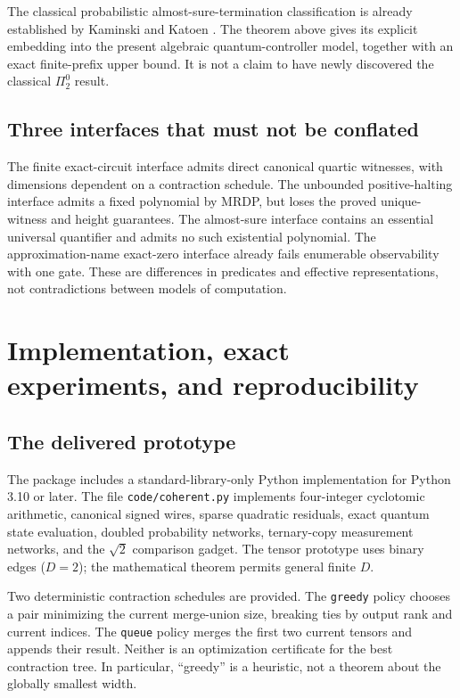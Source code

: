 \documentclass[11pt,letterpaper]{article}
\numberwithin{equation}{section}
\theoremstyle{definition}
\theoremstyle{remark}
\newcommand{\srcmark}[1]{\par\noindent{\small\itshape [source~#1]}\par}
\begin{document}
The classical probabilistic almost-sure-termination classification is already
established by Kaminski and Katoen \cite{kaminski-katoen}. The theorem above gives
its explicit embedding into the present algebraic quantum-controller model,
together with an exact finite-prefix upper bound. It is not a claim to have
newly discovered the classical $\Pi^0_2$ result.

\subsection{Three interfaces that must not be conflated}

The finite exact-circuit interface admits direct canonical quartic witnesses,
with dimensions dependent on a contraction schedule. The unbounded
positive-halting interface admits a fixed polynomial by MRDP, but loses the
proved unique-witness and height guarantees. The almost-sure interface contains
an essential universal quantifier and admits no such existential polynomial.
The approximation-name exact-zero interface already fails enumerable
observability with one gate. These are differences in predicates and effective
representations, not contradictions between models of computation.

\section{Implementation, exact experiments, and reproducibility}
\label{pqc:cc:sec:implementation}
\srcmark{10}

\subsection{The delivered prototype}

The package includes a standard-library-only Python implementation for
Python 3.10 or later. The file \texttt{code/coherent.py} implements four-integer
cyclotomic arithmetic, canonical signed wires, sparse quadratic residuals,
exact quantum state evaluation, doubled probability networks, ternary-copy
measurement networks, and the $\sqrt2$ comparison gadget. The tensor prototype
uses binary edges ($D=2$); the mathematical theorem permits general finite $D$.

Two deterministic contraction schedules are provided. The \texttt{greedy}
policy chooses a pair minimizing the current merge-union size, breaking ties
by output rank and current indices. The \texttt{queue} policy merges the first
two current tensors and appends their result. Neither is an optimization
certificate for the best contraction tree. In particular, ``greedy'' is a
heuristic, not a theorem about the globally smallest width.
\end{document}
